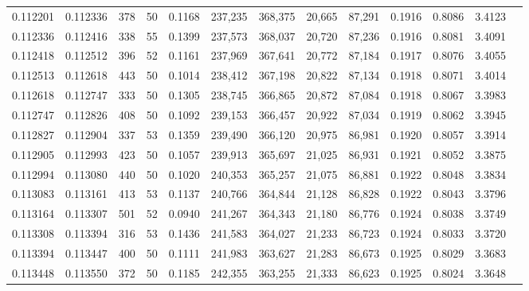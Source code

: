 \begin{tabular}{rrrrrrrrrrrrr}
0.112201 & 0.112336 &   378 &  50 &                                     0.1168 & 237,235 & 368,375 &  20,665 &  87,291 & 0.1916 & 0.8086 & 3.4123 \\
0.112336 & 0.112416 &   338 &  55 &                                     0.1399 & 237,573 & 368,037 &  20,720 &  87,236 & 0.1916 & 0.8081 & 3.4091 \\
0.112418 & 0.112512 &   396 &  52 &                                     0.1161 & 237,969 & 367,641 &  20,772 &  87,184 & 0.1917 & 0.8076 & 3.4055 \\
0.112513 & 0.112618 &   443 &  50 &                                     0.1014 & 238,412 & 367,198 &  20,822 &  87,134 & 0.1918 & 0.8071 & 3.4014 \\
0.112618 & 0.112747 &   333 &  50 &                                     0.1305 & 238,745 & 366,865 &  20,872 &  87,084 & 0.1918 & 0.8067 & 3.3983 \\
0.112747 & 0.112826 &   408 &  50 &                                     0.1092 & 239,153 & 366,457 &  20,922 &  87,034 & 0.1919 & 0.8062 & 3.3945 \\
0.112827 & 0.112904 &   337 &  53 &                                     0.1359 & 239,490 & 366,120 &  20,975 &  86,981 & 0.1920 & 0.8057 & 3.3914 \\
0.112905 & 0.112993 &   423 &  50 &                                     0.1057 & 239,913 & 365,697 &  21,025 &  86,931 & 0.1921 & 0.8052 & 3.3875 \\
0.112994 & 0.113080 &   440 &  50 &                                     0.1020 & 240,353 & 365,257 &  21,075 &  86,881 & 0.1922 & 0.8048 & 3.3834 \\
0.113083 & 0.113161 &   413 &  53 &                                     0.1137 & 240,766 & 364,844 &  21,128 &  86,828 & 0.1922 & 0.8043 & 3.3796 \\
0.113164 & 0.113307 &   501 &  52 &                                     0.0940 & 241,267 & 364,343 &  21,180 &  86,776 & 0.1924 & 0.8038 & 3.3749 \\
0.113308 & 0.113394 &   316 &  53 &                                     0.1436 & 241,583 & 364,027 &  21,233 &  86,723 & 0.1924 & 0.8033 & 3.3720 \\
0.113394 & 0.113447 &   400 &  50 &                                     0.1111 & 241,983 & 363,627 &  21,283 &  86,673 & 0.1925 & 0.8029 & 3.3683 \\
0.113448 & 0.113550 &   372 &  50 &                                     0.1185 & 242,355 & 363,255 &  21,333 &  86,623 & 0.1925 & 0.8024 & 3.3648 \\

\end{tabular}
